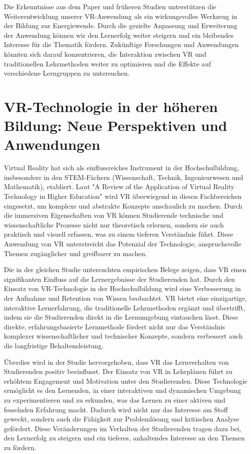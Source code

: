 \documentclass[draft]{vutinfth} %
\begin{document}
Die Erkenntnisse aus dem Paper und früheren Studien unterstützen die Weiterentwicklung unserer VR-Anwendung als ein wirkungsvolles Werkzeug in der Bildung zur Energiewende. Durch die gezielte Anpassung und Erweiterung der Anwendung können wir den Lernerfolg weiter steigern und ein bleibendes Interesse für die Thematik fördern. Zukünftige Forschungen und Anwendungen könnten sich darauf konzentrieren, die Interaktion zwischen VR und traditionellen Lehrmethoden weiter zu optimieren und die Effekte auf verschiedene Lerngruppen zu untersuchen.

\section{VR-Technologie in der höheren Bildung: Neue Perspektiven und Anwendungen}
Virtual Reality hat sich als einflussreiches Instrument in der Hochschulbildung, insbesondere in den STEM-Fächern (Wissenschaft, Technik, Ingenieurwesen und Mathematik), etabliert. Laut "A Review of the Application of Virtual Reality Technology in Higher Education" wird VR überwiegend in diesen Fachbereichen eingesetzt, um komplexe und abstrakte Konzepte anschaulich zu machen. Durch die immersiven Eigenschaften von VR können Studierende technische und wissenschaftliche Prozesse nicht nur theoretisch erlernen, sondern sie auch praktisch und visuell erfassen, was zu einem tieferen Verständnis führt. Diese Anwendung von VR unterstreicht das Potenzial der Technologie, anspruchsvolle Themen zugänglicher und greifbarer zu machen.

Die in der gleichen Studie untersuchten empirischen Belege zeigen, dass VR einen signifikanten Einfluss auf die Lernergebnisse der Studierenden hat. Durch den Einsatz von VR-Technologie in der Hochschulbildung wird eine Verbesserung in der Aufnahme und Retention von Wissen beobachtet. VR bietet eine einzigartige, interaktive Lernerfahrung, die traditionelle Lehrmethoden ergänzt und übertrifft, indem sie die Studierenden direkt in die Lernumgebung eintauchen lässt. Diese direkte, erfahrungsbasierte Lernmethode fördert nicht nur das Verständnis komplexer wissenschaftlicher und technischer Konzepte, sondern verbessert auch die langfristige Behaltensleistung.

Überdies wird in der Studie hervorgehoben, dass VR das Lernverhalten von Studierenden positiv beeinflusst. Der Einsatz von VR in Lehrplänen führt zu erhöhtem Engagement und Motivation unter den Studierenden. Diese Technologie ermöglicht es den Lernenden, in einer interaktiven und dynamischen Umgebung zu experimentieren und zu erkunden, was das Lernen zu einer aktiven und fesselnden Erfahrung macht. Dadurch wird nicht nur das Interesse am Stoff geweckt, sondern auch die Fähigkeit zur Problemlösung und kritischen Analyse gefördert. Diese Veränderungen im Verhalten der Studierenden tragen dazu bei, den Lernerfolg zu steigern und ein tieferes, anhaltendes Interesse an den Themen zu fördern.
\end{document}

